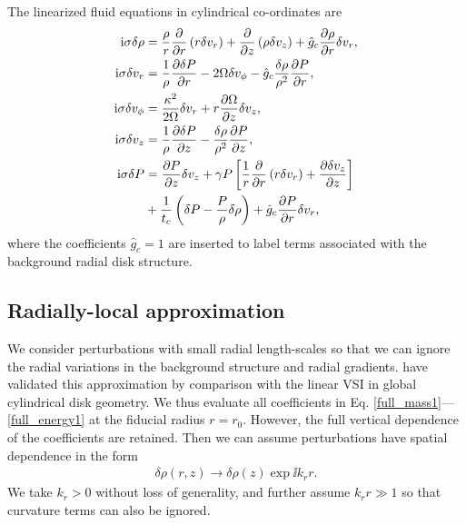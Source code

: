 The linearized fluid equations in cylindrical co-ordinates are  
\begin{align}
  \mathrm{i}\sigma\delta\rho &= \frac{\rho}{r}\frac{\partial}{\partial r}\left(r\delta v_r\right) + \frac{\partial}{\partial
    z}\left(\rho\delta v_z\right)  + \hat{g}_c\frac{\partial\rho}{\partial r}\delta v_r,\label{full_mass1}\\
  \mathrm{i}\sigma\delta v_r &= \frac{1}{\rho}\frac{\partial\delta P}{\partial r} - 2\Omega
  \delta v_\phi - \hat{g}_c\frac{\delta\rho}{\rho^2}\frac{\partial P}{\partial r},\\ 
  \mathrm{i}\sigma\delta v_\phi  &= \frac{\kappa^2}{2\Omega}\delta v_r +
  r\frac{\partial\Omega}{\partial z}\delta v_z,\\
  \mathrm{i} \sigma\delta v_z &= \frac{1}{\rho}\frac{\partial\delta P}{\partial z} -
  \frac{\delta \rho}{\rho^2}\frac{\partial P}{\partial z},\\
  \mathrm{i}\sigma\delta P &=\frac{\partial P}{\partial z}\delta v_z + \gamma P
  \left[\frac{1}{r}\frac{\partial}{\partial r}\left(r\delta v_r\right) + \frac{\partial
      \delta v_z}{\partial z}\right]\notag \\
  &+ \frac{1}{t_c}\left(\delta P -  
    \frac{P}{\rho}\delta\rho\right) + \hat{g}_c \frac{\partial P}{\partial r}\delta v_r,\label{full_energy1}
\end{align}
where the coefficients $\hat{g}_c=1$ are inserted to label terms
associated with the background radial disk structure. 





\subsection{Radially-local approximation}  
We consider perturbations with small radial length-scales 
so that we can ignore the radial variations in the background
structure and radial gradients.  have validated this
approximation by comparison with the linear VSI in global cylindrical
disk geometry. We thus evaluate all coefficients in
Eq. \ref{full_mass1}---\ref{full_energy1} at the fiducial radius
$r=r_0$. However, the full vertical dependence of the coefficients are
retained. Then we can assume perturbations have spatial dependence in
the form 
\begin{align}
  \delta \rho(r,z) \to \delta\rho(z)\exp{\ii k_r r}.
\end{align}
We take $k_r>0$ without loss of generality, and further assume $k_rr\gg1$ so that curvature terms can also be 
ignored.       

